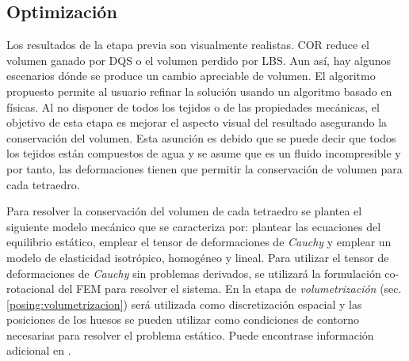 

 \subsection{Optimización}
\label{posing:optimizacion}

Los resultados de la etapa previa son visualmente realistas. \ac{COR} reduce el volumen ganado por \ac{DQS} o el volumen perdido por \ac{LBS}. Aun así, hay algunos escenarios dónde se produce un cambio apreciable de volumen. El algoritmo propuesto permite al usuario refinar la solución usando un algoritmo basado en físicas. Al no disponer de todos los tejidos o de las propiedades mecánicas, el objetivo de esta etapa es mejorar el aspecto visual del resultado asegurando la conservación del volumen. Esta asunción es debido que se puede decir que todos los tejidos están compuestos de agua y se asume que es un fluido incompresible y por tanto, las deformaciones tienen que permitir la conservación de volumen para cada tetraedro.




Para resolver la conservación del volumen de cada tetraedro se plantea el siguiente modelo mecánico que se caracteriza por: plantear las ecuaciones del equilibrio estático, emplear el tensor de deformaciones de \emph{Cauchy} y emplear un modelo de elasticidad isotrópico, homogéneo y lineal. Para utilizar el tensor de deformaciones de \emph{Cauchy} sin problemas derivados, se utilizará la formulación co-rotacional del \ac{FEM} para resolver el sistema. En la etapa de \emph{volumetrización} (sec. \ref{posing:volumetrizacion}) será utilizada como discretización espacial y las posiciones de los huesos se pueden utilizar como  condiciones de contorno necesarias para resolver el problema estático. Puede encontrase información adicional en \cite{Muller2004}. 


